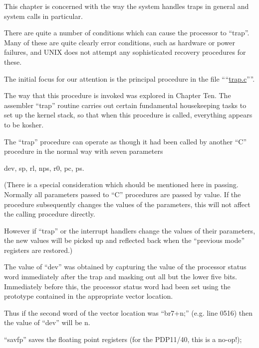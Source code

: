 %
%

This chapter is concerned with the way
the system handles traps in general and
system calls in particular.

There are quite a number of conditions
which can cause the processor to
``trap''. Many of these are quite
clearly error conditions, such as
hardware or power failures, and UNIX
does not attempt any sophisticated
recovery procedures for these.

The initial focus for our attention is
the principal procedure in the file
````\href{./v6/ken/trap.c}{trap.c}''''.


The way that this procedure is invoked
was explored in Chapter Ten. The
assembler ``trap'' routine carries out
certain fundamental housekeeping tasks
to set up the kernel stack, so that
when this procedure is called, everything appears to be kosher.

The ``trap'' procedure can operate as
though it had been called by another
``C'' procedure in the normal way with
seven parameters

\begin{center}
 dev, sp, rl, nps, r0, pc, ps.
\end{center}

(There is a special consideration which
should be mentioned here in passing.
Normally all parameters passed to ``C''
procedures are passed by value. If the
procedure subsequently changes the
values of the parameters, this will not
affect the calling procedure directly.

However if ``trap'' or the interrupt
handlers change the values of their
parameters, the new values will be
picked up and reflected back when the
``previous mode'' registers are
restored.)

The value of ``dev'' was obtained by capturing the value of the processor
status word immediately after the trap
and masking out all but the lower five
bits. Immediately before this, the processor status word had been set using
the prototype contained in the
appropriate vector location.

Thus if the second word of the vector
location was ``br7+n;'' (e.g. line 0516)
then the value of ``dev'' will be n.

\bd
\item[2698:] ``savfp'' saves the floating point
 registers (for the PDP11/40, this
 is a no-op!);

